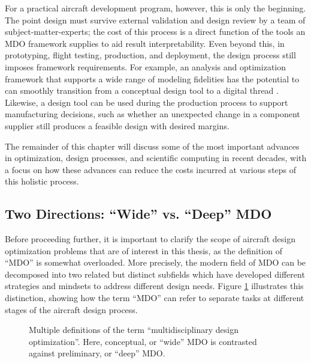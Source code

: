 \documentclass[12pt,vi,oneside,table]{report}
\begin{document}
    For a practical aircraft development program, however, this is only the beginning. The point design must survive external validation and design review by a team of subject-matter-experts; the cost of this process is a direct function of the tools an MDO framework supplies to aid result interpretability. Even beyond this, in prototyping, flight testing, production, and deployment, the design process still imposes framework requirements. For example, an analysis and optimization framework that supports a wide range of modeling fidelities has the potential to can smoothly transition from a conceptual design tool to a digital thread \cite{niederer_scaling_2021, singh_engineering_2018}. Likewise, a design tool can be used during the production process to support manufacturing decisions, such as whether an unexpected change in a component supplier still produces a feasible design with desired margins.

    The remainder of this chapter will discuss some of the most important advances in optimization, design processes, and scientific computing in recent decades, with a focus on how these advances can reduce the costs incurred at various steps of this holistic process.

    \subsection{Two Directions: ``Wide'' vs. ``Deep'' MDO}
    \label{sec:wide_vs_deep}

    Before proceeding further, it is important to clarify the scope of aircraft design optimization problems that are of interest in this thesis, as the definition of ``MDO'' is somewhat overloaded. More precisely, the modern field of MDO can be decomposed into two related but distinct subfields which have developed different strategies and mindsets to address different design needs. Figure \ref{fig:mdo_overloaded_term} illustrates this distinction, showing how the term ``MDO'' can refer to separate tasks at different stages of the aircraft design process.

    \begin{figure}[htbp!]
        \centering
        \caption{Multiple definitions of the term ``multidisciplinary design optimization''. Here, conceptual, or ``wide'' MDO is contrasted against preliminary, or ``deep'' MDO.}
        \label{fig:mdo_overloaded_term}
    \end{figure}
\end{document}
